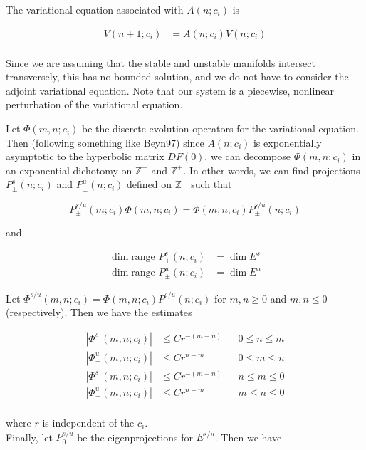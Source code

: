 \documentclass[12pt]{article}
\def\Z{{\mathbb Z}}
\begin{document}
The variational equation associated with $A(n; c_i)$ is

\begin{align}
V(n+1; c_i) &= A(n; c_i) V(n; c_i) \label{vareq} \\
\end{align}

Since we are assuming that the stable and unstable manifolds intersect transversely, this has no bounded solution, and we do not have to consider the adjoint variational equation. Note that our system is a piecewise, nonlinear perturbation of the variational equation.

Let $\Phi(m, n; c_i)$ be the discrete evolution operators for the variational equation. Then (following something like Beyn97) since $A(n; c_i)$ is exponentially asymptotic to the hyperbolic matrix $DF(0)$, we can decompose $\Phi(m, n; c_i)$ in an exponential dichotomy on $\Z^-$ and $\Z^+$. In other words, we can find projections $P_\pm^s(n; c_i)$ and $P_\pm^u(n; c_i)$ defined on $\Z^\pm$ such that

\begin{equation}\label{projcommute}
P_\pm^{s/u}(m; c_i) \Phi(m, n; c_i) =  \Phi(m, n; c_i) P_\pm^{s/u}(n; c_i)
\end{equation}

and

\begin{align*}
\dim \text{range }P_\pm^s(n; c_i) &= \dim E^s \\
\dim \text{range }P_\pm^u(n; c_i) &= \dim E^u
\end{align*}

Let $\Phi_\pm^{s/u}(m, n; c_i) = \Phi(m, n; c_i) P_\pm^{s/u}(n; c_i)$ for $m, n \geq 0$ and $m, n \leq 0$ (respectively). Then we have the estimates

\begin{align*}
|\Phi_+^s(m, n; c_i)| &\leq C r^{-(m - n)} && 0 \leq n \leq m \\
|\Phi_+^u(m, n; c_i)| &\leq C r^{n-m} && 0 \leq m \leq n \\
|\Phi_-^s(m, n; c_i)| &\leq C r^{-(m - n)} && n \leq m \leq 0 \\
|\Phi_-^u(m, n; c_i)| &\leq C r^{n-m} && m \leq n \leq 0\\
\end{align*}

where $r$ is independent of the $c_i$.\\

Finally, let $P_0^{s/u}$ be the eigenprojections for $E^{s/u}$. Then we have
\end{document}
